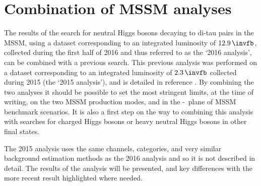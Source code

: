 \chapter{Combination of MSSM analyses}
\label{sec:mssm_combination}
The results of the search for neutral Higgs bosons decaying to di-tau pairs in the \ac{MSSM}, 
using a dataset
corresponding to an integrated luminosity of $12.9\,\invfb$, collected during the
first half of 2016 and thus referred to as the `2016 analysis', can be combined 
with a previous search. This previous analysis
was performed on a dataset corresponding to an integrated luminosity of $2.3\,\invfb$ 
collected during 2015 (the `2015 analysis'), and is detailed in reference \cite{CMS-PAS-HIG-16-006}.
By combining the two analyses it should be possible to set the most stringent
limits, at the time of writing, on the two \ac{MSSM} production modes, and in the \mA-\tanb~plane of 
\ac{MSSM} benchmark scenarios. It is also
a first step on the way to combining this \AHtotautau analysis with
searches for charged Higgs bosons or heavy neutral Higgs bosons in 
other final states. 

The 2015 analysis uses the same channels, categories, and very
similar background estimation methods as the 2016 analysis and so
it is not described in detail. The results of the analysis will 
be presented, and key differences with the more recent result highlighted
where needed.

